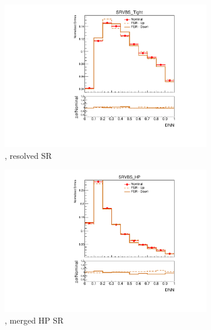 \begin{figure}[p]
    \centering
    \begin{subfigure}[b]{0.3\textwidth}
        \includegraphics[width=\textwidth]{figures/1lep/PDFUnc/FSR/ttbar_0ptag2pjet_0ptv_SRVBS_Tight_DNN_SysTheoryFSR_Top__1up_Norm.pdf}
        \caption{\ttbar, resolved SR}
    \end{subfigure}
    \begin{subfigure}[b]{0.3\textwidth}
        \includegraphics[width=\textwidth]{figures/1lep/PDFUnc/FSR/ttbar_0ptag1pfat0pjet_0ptv_SRVBS_HP_DNN_SysTheoryFSR_Top__1up_Norm.pdf}
        \caption{\ttbar, merged HP SR}
    \end{subfigure}
    \begin{subfigure}[b]{0.3\textwidth}

\end{subfigure}
\end{figure}
